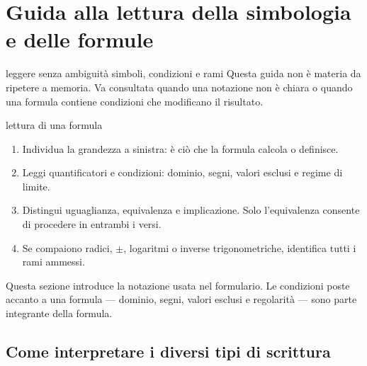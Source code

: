 \chapter*{Guida alla lettura della simbologia e delle formule}

\begin{obiettivocapitolo}{leggere senza ambiguità simboli, condizioni e rami}
Questa guida non è materia da ripetere a memoria. Va consultata quando una notazione non è chiara o quando una formula contiene condizioni che modificano il risultato.
\end{obiettivocapitolo}
\begin{proceduraesame}{lettura di una formula}
\begin{enumerate}
\item Individua la grandezza a sinistra: è ciò che la formula calcola o definisce.
\item Leggi quantificatori e condizioni: dominio, segni, valori esclusi e regime di limite.
\item Distingui uguaglianza, equivalenza e implicazione. Solo l'equivalenza consente di procedere in entrambi i versi.
\item Se compaiono radici, $\pm$, logaritmi o inverse trigonometriche, identifica tutti i rami ammessi.
\end{enumerate}
\end{proceduraesame}

Questa sezione introduce la notazione usata nel formulario. Le condizioni poste accanto a una formula --- dominio, segni, valori esclusi e regolarità --- sono parte integrante della formula.

\section{Come interpretare i diversi tipi di scrittura}\label{come-interpretare-i-diversi-tipi-di-scrittura}

